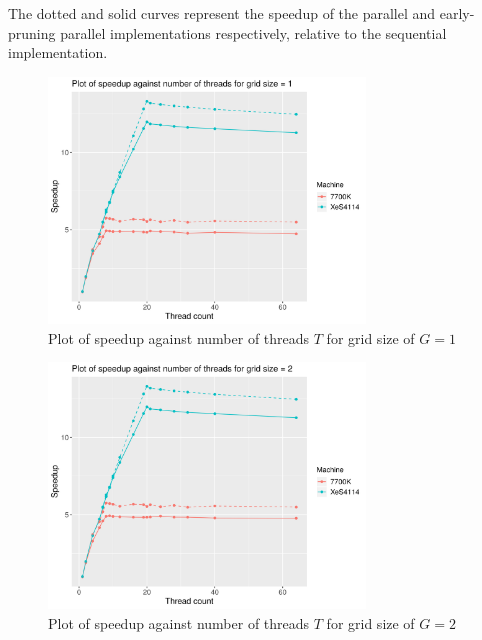 \documentclass[12pt]{article}
\begin{document}
The dotted and solid curves represent the speedup of the parallel and early-pruning parallel implementations respectively, relative to the sequential implementation.

\begin{figure}[H]
    \centering
    \includegraphics[width=0.75\textwidth]{./extraProcessedResults/optPar-gridSize1-speedup}
    \caption{Plot of speedup against number of threads $T$ for grid size of $G = 1$}
    \label{fig:optPar-gridSize1-speedup}
\end{figure}

\begin{figure}[H]
    \centering
    \includegraphics[width=0.75\textwidth]{./extraProcessedResults/optPar-gridSize2-speedup}
    \caption{Plot of speedup against number of threads $T$ for grid size of $G = 2$}
    \label{fig:optPar-gridSize2-speedup}
\end{figure}
\end{document}
